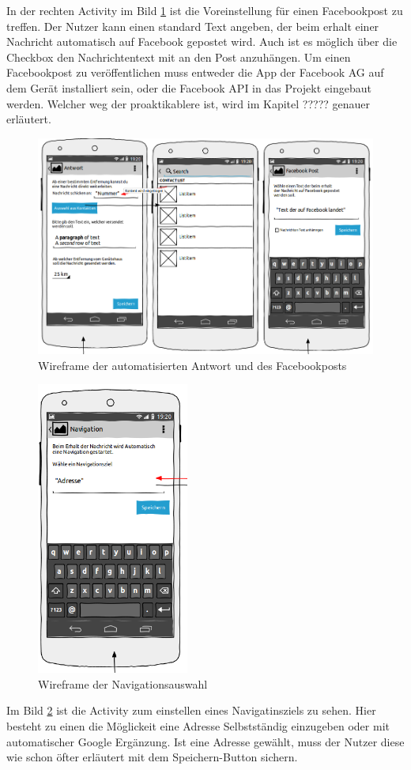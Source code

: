 In der rechten Activity im Bild \ref{Wireframe Antwort} ist die Voreinstellung f\"ur einen Facebookpost zu treffen. Der Nutzer kann einen standard Text angeben, der beim erhalt einer Nachricht automatisch auf Facebook gepostet wird. Auch ist es m\"oglich \"uber die Checkbox den Nachrichtentext mit an den Post anzuh\"angen. Um einen Facebookpost zu ver\"offentlichen muss entweder die App der Facebook AG auf dem Ger\"at installiert sein, oder die Facebook API in das Projekt eingebaut werden. Welcher weg der proaktikablere ist, wird im Kapitel ????? genauer erl\"autert.
\begin{figure}[!ht]
\centering
\includegraphics[width=16cm]{Bilder/WireframeAntwort.png}
\caption{Wireframe der automatisierten Antwort und des Facebookposts}
\label{Wireframe Antwort}
\centering
\end{figure}

\FloatBarrier
\begin{figure}
\vspace{-13pt}
\includegraphics[width=5cm]{Bilder/WireframeNaviAuswahl.png}
\caption{Wireframe der Navigationsauswahl}
\label{Wireframe NaviAuswahl}
\vspace{-230pt}
\end{figure}
Im Bild \ref{Wireframe NaviAuswahl} ist die Activity zum einstellen eines Navigatinsziels zu sehen. Hier besteht zu einen die M\"oglickeit eine Adresse Selbstst\"andig einzugeben oder mit automatischer Google Erg\"anzung. Ist eine Adresse gew\"ahlt, muss der Nutzer diese wie schon \"ofter erl\"autert mit dem Speichern-Button sichern.

